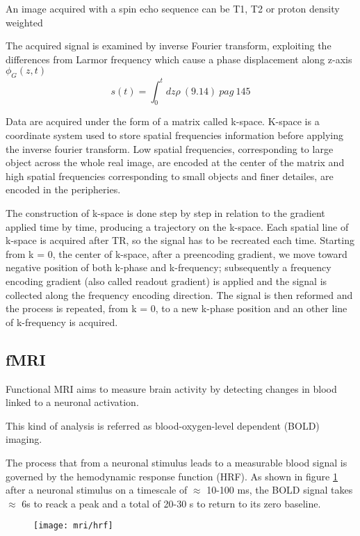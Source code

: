 \documentclass[a4paper,11pt]{article}
\begin{document}
An image acquired with a spin echo sequence can be T1, T2 or proton density weighted

The acquired signal is examined by inverse Fourier transform, exploiting the differences from Larmor frequency which cause a phase displacement along z-axis $\phi_G(z, t)$
\begin{equation}
s(t) = \int_0^tdz\rho \ (9.14) \ pag \ 145
\end{equation}

Data are acquired under the form of a matrix called k-space.
K-space is a coordinate system used to store spatial frequencies information before applying the inverse fourier transform.
Low spatial frequencies, corresponding to large object across the whole real image, are encoded at the center of the matrix and high spatial frequencies corresponding to small objects and finer detailes, are encoded in the peripheries.

The construction of k-space is done step by step in relation to the gradient applied time by time, producing a trajectory on the k-space.
Each spatial line of k-space is acquired after TR, so the signal has to be recreated each time.
Starting from k = 0, the center of k-space, after a preencoding gradient, we move toward negative position of both k-phase and k-frequency; subsequently a frequency encoding gradient (also called readout gradient) is applied and the signal is collected along the frequency encoding direction.
The signal is then reformed and the process is repeated, from k = 0, to a new k-phase position and an other line of k-frequency is acquired.



\subsection{fMRI}
Functional MRI aims to measure brain activity by detecting changes in blood linked to a neuronal activation.

This kind of analysis is referred as blood-oxygen-level dependent (BOLD) imaging.


The process that from a neuronal stimulus leads to a measurable blood signal is governed by the hemodynamic response function (HRF).
As shown in figure \ref{fig:hrf} after a neuronal stimulus on a timescale of $\approx$ 10-100 ms, the BOLD signal takes $\approx$ 6s to reack a peak and a total of 20-30 s to return to its zero baseline.

\begin{figure}[h]
\texttt{[image: mri/hrf]}
\caption{}
\label{fig:hrf}
\end{figure}
\end{document}
